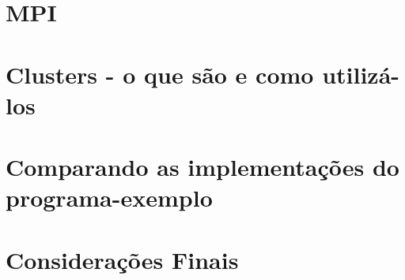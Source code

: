     \chapter{MPI}
    
    \chapter{Clusters - o que são e como utilizá-los}
    
    \chapter{Comparando as implementações do programa-exemplo}
    
    \chapter{Considerações Finais}
    
	
	
	

